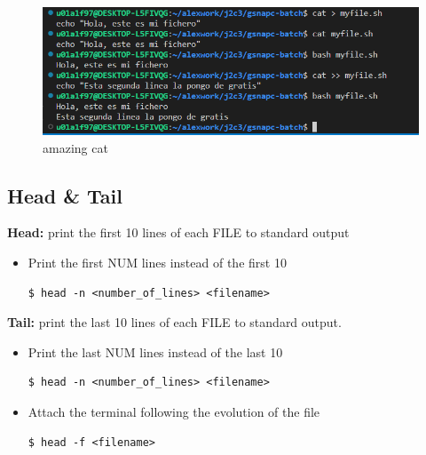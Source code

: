 \documentclass{article}
\newenvironment{codetemplate}[1][]{%
  \mybasecolorbox[#1]
  \itshape
}{%
  \endmybasecolorbox
}
\begin{document}
\begin{figure}[H]
    \centering
    \includegraphics[scale=0.7]{pictures/image1.png}
    \caption{amazing cat}
\end{figure}

\subsection{Head \& Tail}

\textbf{Head:} print the first 10 lines of each FILE to standard output

\begin{itemize}
    \item Print the first NUM lines instead of the first 10
\begin{codetemplate}{}
\begin{verbatim}
$ head -n <number_of_lines> <filename>
\end{verbatim}
\end{codetemplate}
\end{itemize}

\textbf{Tail:}  print the last 10 lines of each FILE to standard output.

\begin{itemize}
    \item Print the last NUM lines instead of the last 10
\begin{codetemplate}{}
\begin{verbatim}
$ head -n <number_of_lines> <filename>
\end{verbatim}
\end{codetemplate}

    \item Attach the terminal following the evolution of the file
\begin{codetemplate}{}
\begin{verbatim}
$ head -f <filename>
\end{verbatim}
\end{codetemplate}
\end{itemize}
\end{document}
